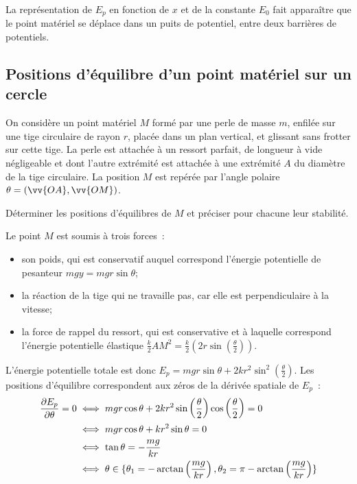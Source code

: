 La représentation de \(E_p\) en fonction de \(x\) et de la constante \(E_0\) 
fait apparaître que le point matériel se déplace dans un puits de potentiel, 
entre deux barrières de potentiels.

\subsection{Positions d'équilibre d'un point matériel sur un cercle}%
\label{chap4-subsec:positionsdequilibredunpointsuruncercle}%

On considère un point matériel \(M\) formé par une perle de masse \(m\), 
enfilée sur une tige circulaire de rayon \(r\), placée dans un plan vertical, 
et glissant sans frotter sur cette tige. La perle est attachée à un ressort 
parfait, de longueur à vide négligeable et dont l'autre extrémité est attachée 
à une extrémité \(A\) du diamètre de la tige circulaire. La position \(M\) est 
repérée par l'angle polaire \(\theta = (\vv{OA}, \vv{OM})\).

Déterminer les positions d'équilibres de \(M\) et préciser pour chacune leur 
stabilité.

Le point \(M\) est soumis à trois forces~:
\begin{itemize}%
\item son poids, qui est conservatif auquel correspond l'énergie potentielle de 
  pesanteur \(mgy=mgr\sin\theta\);
\item la réaction de la tige qui ne travaille pas, car elle est perpendiculaire 
  à la vitesse;
\item la force de rappel du ressort, qui est conservative et à laquelle 
  correspond l'énergie potentielle élastique 
    \(\frac{k}{2}AM^2=\frac{k}{2}\left(2r\sin\left(\frac{\theta}{2}\right)\right)\).
\end{itemize}%

L'énergie potentielle totale est donc \(E_p = mgr \sin\theta + 2kr^2 
\sin^2\left(\frac{\theta}{2}\right)\). Les positions d'équilibre correspondent 
aux zéros de la dérivée spatiale de \(E_p\)~:
\begin{align}%
  \derivep{E_p}{\theta} = 0 &\iff mgr\cos\theta +2kr^2 
  \sin\left(\frac{\theta}{2}\right) \cos\left(\frac{\theta}{2}\right)=0 \\
  & \iff mgr\cos\theta + kr^2 \sin\theta=0 \\
  & \iff \tan\theta = -\frac{mg}{kr} \\
  & \iff \theta \in \{\theta_1=-\arctan \left( \frac{mg}{kr} \right), 
  \theta_2=\pi-\arctan \left( \frac{mg}{kr} \right)\}
\end{align}%

